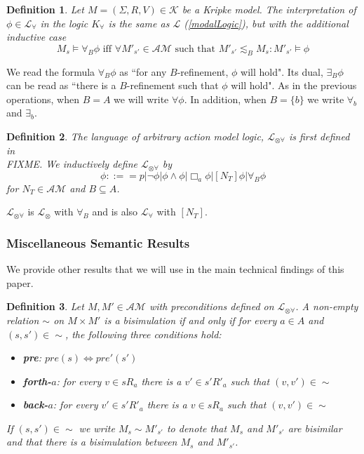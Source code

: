 \documentclass[12pt, a4paper, titlepage]{scrartcl}
\newtheorem{defn}{Definition}[subsection]
\numberwithin{equation}{section}
\newcommand{\sqex}[1]{[{#1}]}
\newcommand{\lang}{\mathcal{L}}
\newcommand{\langRefine}{\lang_{\forall}}
\newcommand{\langActEx}{\lang_{\otimes}}
\newcommand{\langArbAct}{\lang_{\otimes\forall}}
\newcommand{\kripkeClass}{\mathcal{K}}
\newcommand{\eventClass}{\mathcal{AM}}
\newcommand{\FIXME}{{\bf FIXME}}
\begin{document}
\begin{defn} \label{refineLogic}
Let $M = (\Sigma, R, V) \in \kripkeClass$ be a Kripke model.
The interpretation of $\phi \in \langRefine$ in the logic $K_\forall$ is the same as $\lang$
(\ref{modalLogic}), but with the additional inductive case
\[
	M_s \models \forall_B \phi \text{ iff } \forall M'_{s'} \in \eventClass \text{ such that } M'_{s'}
	\lesssim_B M_s : M'_{s'} \models \phi
\]
\end{defn}
We read the formula $\forall_B \phi$ as ``for any $B$-refinement, $\phi$ will hold".
Its dual, $\exists_B \phi$ can be read as ``there is a $B$-refinement such that $\phi$ will hold".
As in the previous operations, when $B = A$ we will write $\forall \phi$.
In addition, when $B = \{b\}$ we write $\forall_b$ and $\exists_b$.


\begin{defn} \label{arbActLogic}
The language of arbitrary action model logic, $\langArbAct$ is first defined in \\FIXME.
We inductively define $\langArbAct$ by
\[
	\phi ::== p | \neg \phi | \phi \land \phi | \Box_a \phi | \sqex{N_T} \phi | \forall_B \phi
\]
for $N_T \in \eventClass$ and $B \subseteq A$.
\end{defn}
$\langArbAct$ is $\langActEx$ with $\forall_B$ and is also $\langRefine$ with $\sqex{N_T}$.



\subsubsection{Miscellaneous Semantic Results}
We provide other results that we will use in the main technical findings of this paper.

\begin{defn} \label{bisimEvent}
	Let $M, M' \in \eventClass$ with preconditions defined on $\langArbAct$.
	A non-empty relation $\sim$ on $M \times M'$ is a bisimulation if and only if for every $a \in A$
	and $(s, s') \in \sim$, the following three conditions hold:
	\begin{itemize}
		\item {\bf pre}: $pre(s) \iff pre'(s')$
		\item {\bf forth-$a$}: for every $v \in s R_a$ there is a $v' \in s' R'_a$ such that $(v,v') \in
		\sim$
		\item {\bf back-$a$}: for every $v' \in s' R'_a$ there is a $v \in s R_a$ such that $(v,v') \in
		\sim$
	\end{itemize}
	If $(s, s') \in \sim$ we write $M_s \sim M'_{s'}$ to denote that $M_s$ and $M'_{s'}$ are bisimilar and
	that there is a bisimulation between $M_s$ and $M'_{s'}$.
\end{defn}
\end{document}
